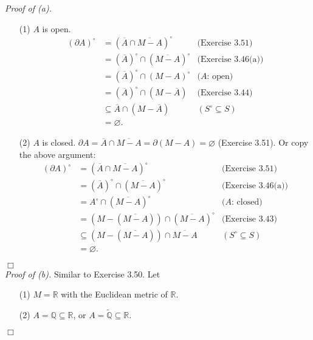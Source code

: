 \documentclass{article}
\begin{document}
\emph{Proof of (a).}
\begin{enumerate}
\item[(1)]
$A$ is open.
\begin{align*}
(\partial A)^{\circ}
&= (\overline{A} \cap \overline{M-A})^{\circ}
  &\text{(Exercise 3.51)} \\
&= (\overline{A})^{\circ} \cap (\overline{M-A})^{\circ}
  &\text{(Exercise 3.46(a))} \\
&= (\overline{A})^{\circ} \cap (M-A)^{\circ}
  &\text{($A$: open)} \\
&= (\overline{A})^{\circ} \cap (M - \overline{A})
  &\text{(Exercise 3.44)} \\
&\subseteq \overline{A} \cap (M - \overline{A})
  &(S^{\circ} \subseteq S) \\
&= \varnothing.
\end{align*}
\item[(2)]
$A$ is closed.
$\partial A
= \overline{A} \cap \overline{M-A}
= \partial (M - A)
= \varnothing$ (Exercise 3.51).
Or copy the above argument:
\begin{align*}
(\partial A)^{\circ}
&= (\overline{A} \cap \overline{M-A})^{\circ}
  &\text{(Exercise 3.51)} \\
&= (\overline{A})^{\circ} \cap (\overline{M-A})^{\circ}
  &\text{(Exercise 3.46(a))} \\
&= A^{\circ} \cap (\overline{M-A})^{\circ}
  &\text{($A$: closed)} \\
&= (M - (\overline{M-A})) \cap (\overline{M-A})^{\circ}
  &\text{(Exercise 3.43)} \\
&\subseteq (M - (\overline{M-A})) \cap \overline{M-A}
  &(S^{\circ} \subseteq S) \\
&= \varnothing.
\end{align*}

\end{enumerate}
$\Box$ \\

\emph{Proof of (b).}
Similar to Exercise 3.50. Let
\begin{enumerate}
\item[(1)]
$M = \mathbb{R}$ with the Euclidean metric of $\mathbb{R}$.
\item[(2)]
$A = \mathbb{Q} \subseteq \mathbb{R}$,
or $A = \widetilde{\mathbb{Q}} \subseteq \mathbb{R}$.
\end{enumerate}
$\Box$ \\\\
\end{document}
